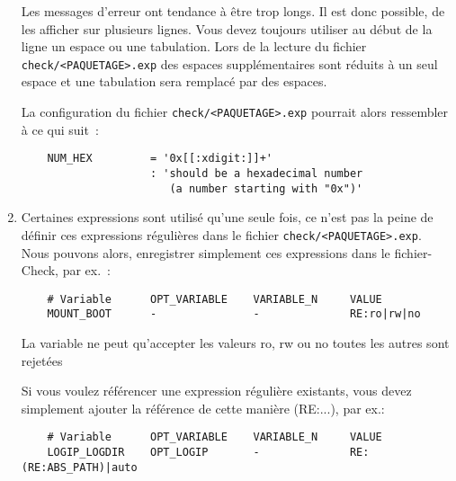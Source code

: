 \begin{enumerate}
Les messages d'erreur ont tendance à être trop longs. Il est donc possible, de
les afficher sur plusieurs lignes.
Vous devez toujours utiliser au début de la ligne un espace ou une tabulation.
Lors de la lecture du fichier \texttt{check/<PAQUETAGE>.exp} des espaces supplémentaires
sont réduits à un seul espace et une tabulation sera remplacé par des espaces.

La configuration du fichier \texttt{check/<PAQUETAGE>.exp} pourrait alors ressembler à ce qui suit~:

\begin{example}
\begin{verbatim}
    NUM_HEX         = '0x[[:xdigit:]]+'
                    : 'should be a hexadecimal number
                       (a number starting with "0x")'
\end{verbatim}
\end{example}

\item {}

Certaines expressions sont utilisé qu’une seule fois, ce n’est pas la peine de
définir ces expressions régulières dans le fichier \texttt{check/<PAQUETAGE>.exp}. Nous pouvons alors,
enregistrer simplement ces expressions dans le fichier-Check, par ex.~:

\begin{example}
\begin{verbatim}
    # Variable      OPT_VARIABLE    VARIABLE_N     VALUE
    MOUNT_BOOT      -               -              RE:ro|rw|no
\end{verbatim}
\end{example}

La variable  ne peut qu’accepter les valeurs \og{}ro\fg{}, \og{}rw\fg{} ou
\og{}no\fg{} toutes les autres sont rejetées

Si vous voulez référencer une expression régulière existants, vous devez
simplement ajouter la référence de cette manière \og{}(RE:...)\fg{}, par ex.:

\begin{example}
\begin{verbatim}
    # Variable      OPT_VARIABLE    VARIABLE_N     VALUE
    LOGIP_LOGDIR    OPT_LOGIP       -              RE:(RE:ABS_PATH)|auto
\end{verbatim}
\end{example}
\end{enumerate}


